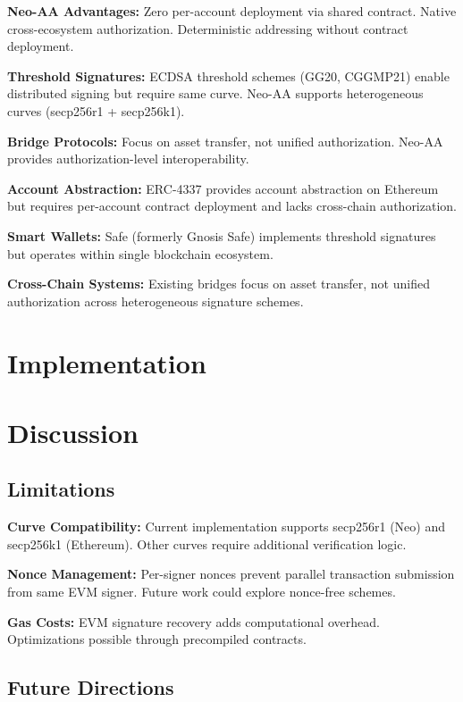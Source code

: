 \documentclass[10pt,twocolumn]{article}
\begin{document}
\textbf{Neo-AA Advantages:} Zero per-account deployment via shared contract. Native cross-ecosystem authorization. Deterministic addressing without contract deployment.


\textbf{Threshold Signatures:} ECDSA threshold schemes (GG20, CGGMP21) enable distributed signing but require same curve. Neo-AA supports heterogeneous curves (secp256r1 + secp256k1).

\textbf{Bridge Protocols:} Focus on asset transfer, not unified authorization. Neo-AA provides authorization-level interoperability.


\textbf{Account Abstraction:} ERC-4337 provides account abstraction on Ethereum but requires per-account contract deployment and lacks cross-chain authorization.

\textbf{Smart Wallets:} Safe (formerly Gnosis Safe) implements threshold signatures but operates within single blockchain ecosystem.

\textbf{Cross-Chain Systems:} Existing bridges focus on asset transfer, not unified authorization across heterogeneous signature schemes.


\section{Implementation}

\section{Discussion}

\subsection{Limitations}

\textbf{Curve Compatibility:} Current implementation supports secp256r1 (Neo) and secp256k1 (Ethereum). Other curves require additional verification logic.

\textbf{Nonce Management:} Per-signer nonces prevent parallel transaction submission from same EVM signer. Future work could explore nonce-free schemes.

\textbf{Gas Costs:} EVM signature recovery adds computational overhead. Optimizations possible through precompiled contracts.

\subsection{Future Directions}
\end{document}
